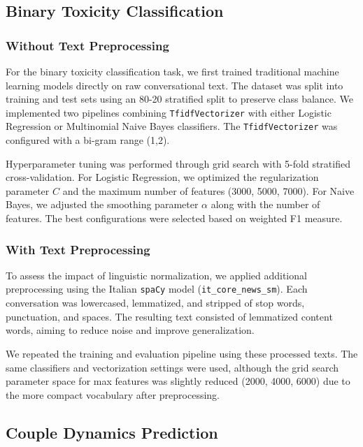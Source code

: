 \documentclass[conference]{IEEEtran}
\begin{document}
\subsection{Binary Toxicity Classification}

\subsubsection{Without Text Preprocessing}

For the binary toxicity classification task, we first trained traditional machine learning models directly on raw conversational text. The dataset was split into training and test sets using an 80-20 stratified split to preserve class balance. We implemented two pipelines combining \texttt{TfidfVectorizer} with either Logistic Regression or Multinomial Naive Bayes classifiers. The \texttt{TfidfVectorizer} was configured with a bi-gram range (1,2).

Hyperparameter tuning was performed through grid search with 5-fold stratified cross-validation. For Logistic Regression, we optimized the regularization parameter \(C\) and the maximum number of features (3000, 5000, 7000). For Naive Bayes, we adjusted the smoothing parameter \(\alpha\) along with the number of features. The best configurations were selected based on weighted F1 measure.

\subsubsection{With Text Preprocessing}

To assess the impact of linguistic normalization, we applied additional preprocessing using the Italian \texttt{spaCy} model (\texttt{it\_core\_news\_sm}). Each conversation was lowercased, lemmatized, and stripped of stop words, punctuation, and spaces. The resulting text consisted of lemmatized content words, aiming to reduce noise and improve generalization.

We repeated the training and evaluation pipeline using these processed texts. The same classifiers and vectorization settings were used, although the grid search parameter space for max features was slightly reduced (2000, 4000, 6000) due to the more compact vocabulary after preprocessing.

\subsection{Couple Dynamics Prediction}
\end{document}
